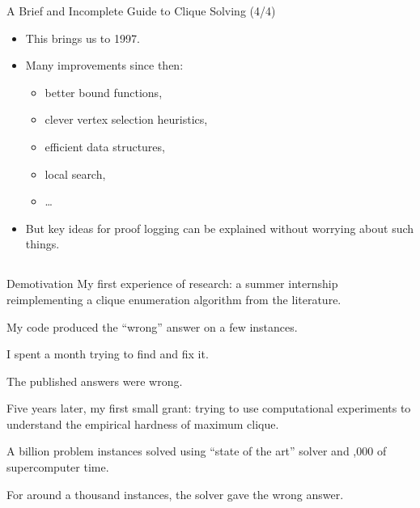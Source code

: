 \documentclass[aspectratio=169,compress,10pt]{beamer}
\begin{document}
\begin{frame}{A Brief and Incomplete Guide to Clique Solving (4/4)}
  \begin{itemize}
  \item
    This brings us to 1997.
    \medskip
  \item
    Many improvements since then:
    \begin{itemize}
    \item
      better bound functions,
    \item
      clever vertex selection heuristics,
    \item
    efficient data structures,
    \item
    local search,
    \item
      \ldots
    \end{itemize}
    \medskip
  \item
    But key ideas for proof logging can be explained without worrying about such things.
  \end{itemize}
\end{frame}

\subsection{}

\begin{frame}{Demotivation}
    My first experience of research: a summer internship reimplementing a clique enumeration
    algorithm from the literature.

    \medskip

    My code produced the ``wrong'' answer on a few instances.

    \medskip\pause

    I spent a month trying to find and fix it.

    \medskip\pause

    The published answers were wrong.

    \medskip\pause

    Five years later, my first small grant: trying to use computational experiments to understand the
    empirical hardness of maximum clique.

    \medskip\pause

    A billion problem instances solved using ``state of the art'' solver and ,000 of
    supercomputer time.

    \medskip\pause

    For around a thousand instances, the solver gave the wrong answer.
\end{frame}
\end{document}
